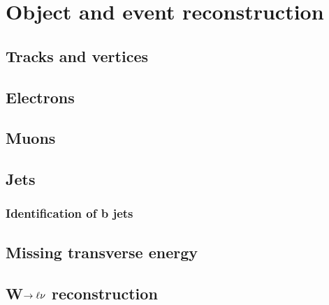 \chapter{Object and event reconstruction}
\label{ch:EventReconstruction}

\section{Tracks and vertices}
\section{Electrons}
\section{Muons}
\section{Jets}
\subsection{Identification of b jets}
\section{Missing transverse energy}
\section{W$\rightarrow\ell\nu$ reconstruction}
